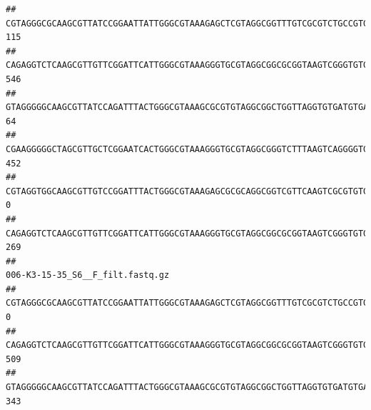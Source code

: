 \documentclass[]{article}
\begin{document}
\begin{verbatim}
## CGTAGGGCGCAAGCGTTATCCGGAATTATTGGGCGTAAAGAGCTCGTAGGCGGTTTGTCGCGTCTGCCGTGAAAGTCCGGGGCTCAACTCCGGATCTGCGGTGGGTACGGGCAGACTAGAGTGATGTAGGGGAGACTGGAATTCCTGGTGTAGCGGTGAAATGCGCAGATATCAGGAGGAACACCGATGGCGAAGGCAGGTCTCTGGGCATTAACTGACGCTGAGGAGCGAAAGCATGGGGAGCGAACA                             115
## CAGAGGTCTCAAGCGTTGTTCGGATTCATTGGGCGTAAAGGGTGCGTAGGCGGCGCGGTAAGTCGGGTGTGAAATCTCGGAGCTTAACTCCGAAACTGCATTCGATACTGCCGTGCTTGAGGACTGGAGAGGAGACTGGAATTTACGGTGTAGCGGTGAAATGCGTAGATATCGTAAGGAAGACCAGTGGCGAAGGCGGGTCTCTGGACAGTTCCTGACGCTGAGGCACGAAGGCCAGGGGAGCAAACG                             546
## GTAGGGGGCAAGCGTTATCCAGATTTACTGGGCGTAAAGCGCGTGTAGGCGGCTGGTTAGGTGTGATGTGAAATCTTCCGGCTCAACCGGAAAACTGCATTGCAAACCGGCCTGGCTAGAGTGCAGGAGAGGGAAGCGGAATTCCAGGTGTAGCGGTGAAATGCGTAGATATCTGGAGGAACACCAGTGGCGAAGGCGGCTTCCTGGCCTGCAACTGACGCTGAGACGCGAAAGCGTGGGGAGCGAAC                               64
## CGAAGGGGGCTAGCGTTGCTCGGAATCACTGGGCGTAAAGGGTGCGTAGGCGGGTCTTTAAGTCAGGGGTGAAATCCTGGAGCTCAACTCCAGAACTGCCTTTGATACTGAAGATCTTGAGTTCGGGAGAGGTGAGTGGAACTGCGAGTGTAGAGGTGAAATTCGTAGATATTCGCAAGAACACCAGTGGCGAAGGCGGCTCACTGGCCCGATACTGACGCTGAGGCACGAAAGCGTGGGGAGCAAACA                             452
## CGTAGGTGGCAAGCGTTGTCCGGATTTACTGGGCGTAAAGAGCGCGCAGGCGGTCGTTCAAGTCGCGTGTGAAAGCCCCCGGCTCAACTGGGGAGGGTCACGCGATACTGATCGACTCGAAGGCAGGAGAGGGTAGTGGAATTCCCGGTGTAGTGGTGAAATGCGTAGATATCGGGAGGAACACCAGTGGCGAAGGCGACTACCTGGCCTGTTCTTGACGCTGAGGCGCGAAAGCTAGGGGAGCAAACG                               0
## CAGAGGTCTCAAGCGTTGTTCGGATTCATTGGGCGTAAAGGGTGCGTAGGCGGCGCGGTAAGTCGGGTGTGAAATCTCGGGGCTTAACTCCGAAACTGCATTCGATACTGCCGTGCTTGAGGACTGGAGAGGAGACTGGAATTTACGGTGTAGCGGTGAAATGCGTAGATATCGTAAGGAAGACCAGTGGCGAAGGCGGGTCTCTGGACAGTTCCTGACGCTGAGGCACGAAGGCCAGGGGAGCAAACG                             269
##                                                                                                                                                                                                                                                           006-K3-15-35_S6__F_filt.fastq.gz
## CGTAGGGCGCAAGCGTTATCCGGAATTATTGGGCGTAAAGAGCTCGTAGGCGGTTTGTCGCGTCTGCCGTGAAAGTCCGGGGCTCAACTCCGGATCTGCGGTGGGTACGGGCAGACTAGAGTGATGTAGGGGAGACTGGAATTCCTGGTGTAGCGGTGAAATGCGCAGATATCAGGAGGAACACCGATGGCGAAGGCAGGTCTCTGGGCATTAACTGACGCTGAGGAGCGAAAGCATGGGGAGCGAACA                                0
## CAGAGGTCTCAAGCGTTGTTCGGATTCATTGGGCGTAAAGGGTGCGTAGGCGGCGCGGTAAGTCGGGTGTGAAATCTCGGAGCTTAACTCCGAAACTGCATTCGATACTGCCGTGCTTGAGGACTGGAGAGGAGACTGGAATTTACGGTGTAGCGGTGAAATGCGTAGATATCGTAAGGAAGACCAGTGGCGAAGGCGGGTCTCTGGACAGTTCCTGACGCTGAGGCACGAAGGCCAGGGGAGCAAACG                              509
## GTAGGGGGCAAGCGTTATCCAGATTTACTGGGCGTAAAGCGCGTGTAGGCGGCTGGTTAGGTGTGATGTGAAATCTTCCGGCTCAACCGGAAAACTGCATTGCAAACCGGCCTGGCTAGAGTGCAGGAGAGGGAAGCGGAATTCCAGGTGTAGCGGTGAAATGCGTAGATATCTGGAGGAACACCAGTGGCGAAGGCGGCTTCCTGGCCTGCAACTGACGCTGAGACGCGAAAGCGTGGGGAGCGAAC                               343

\end{verbatim}
\end{document}
